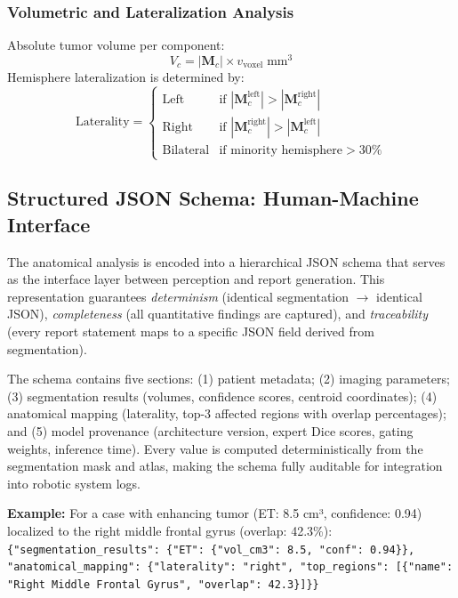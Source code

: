 \documentclass[conference]{IEEEtran}
\begin{document}
\subsubsection{Volumetric and Lateralization Analysis}
Absolute tumor volume per component:
\begin{equation}
V_c = |\mathbf{M}_c| \times v_{\text{voxel}} \;\text{mm}^3
\end{equation}
Hemisphere lateralization is determined by:
\begin{equation}
\text{Laterality} = \begin{cases}
\text{Left}     & \text{if } |\mathbf{M}_c^{\text{left}}| > |\mathbf{M}_c^{\text{right}}| \\
\text{Right}    & \text{if } |\mathbf{M}_c^{\text{right}}| > |\mathbf{M}_c^{\text{left}}| \\
\text{Bilateral} & \text{if minority hemisphere} > 30\%
\end{cases}
\end{equation}

\subsection{Structured JSON Schema: Human-Machine Interface}

The anatomical analysis is encoded into a hierarchical JSON schema that serves as the interface layer between perception and report generation. This representation guarantees \textit{determinism} (identical segmentation $\rightarrow$ identical JSON), \textit{completeness} (all quantitative findings are captured), and \textit{traceability} (every report statement maps to a specific JSON field derived from segmentation).

The schema contains five sections: (1) patient metadata; (2) imaging parameters; (3) segmentation results (volumes, confidence scores, centroid coordinates); (4) anatomical mapping (laterality, top-3 affected regions with overlap percentages); and (5) model provenance (architecture version, expert Dice scores, gating weights, inference time). Every value is computed deterministically from the segmentation mask and atlas, making the schema fully auditable for integration into robotic system logs.

\textbf{Example:} For a case with enhancing tumor (ET: 8.5 cm³, confidence: 0.94) localized to the right middle frontal gyrus (overlap: 42.3\%):
{\small\texttt{\{"segmentation\_results": \{"ET": \{"vol\_cm3": 8.5, "conf": 0.94\}\}, "anatomical\_mapping": \{"laterality": "right", "top\_regions": [\{"name": "Right Middle Frontal Gyrus", "overlap": 42.3\}]\}\}}}
\end{document}
